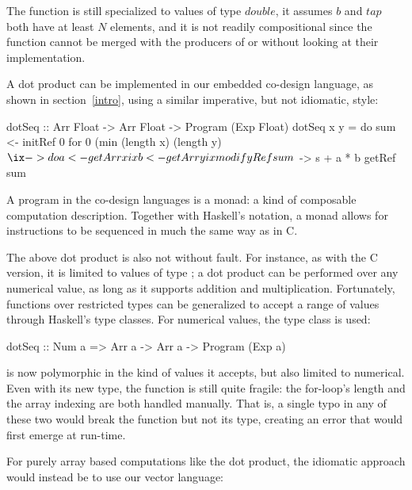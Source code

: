 \documentclass[../paper.tex]{subfiles}
\begin{document}
\noindent The function is still specialized to values of type $double$, it assumes $b$ and $tap$ both have at least $N$ elements, and it is not readily compositional since the function cannot be merged with the producers of  or  without looking at their implementation.

A dot product can be implemented in our embedded co-design language, as shown in section~\ref{intro}, using a similar imperative, but not idiomatic, style:

\begin{code}
dotSeq :: Arr Float -> Arr Float -> Program (Exp Float)
dotSeq x y = do
  sum <- initRef 0
  for 0 (min (length x) (length y) $ \ix -> do
    a <- getArr x ix
    b <- getArr y ix
    modifyRef sum $ \s -> s + a * b
  getRef sum
\end{code}

\noindent A program in the co-design languages is a monad: a kind of composable computation description. Together with Haskell's  notation, a monad allows for instructions to be sequenced in much the same way as in C.

The above dot product is also not without fault. For instance, as with the C version, it is limited to values of type ; a dot product can be performed over any numerical value, as long as it supports addition and multiplication. Fortunately, functions over restricted types can be generalized to accept a range of values through Haskell's type classes. For numerical values, the type class  is used:


\begin{code}
dotSeq :: Num a => Arr a -> Arr a -> Program (Exp a)
\end{code}

\noindent {} is now polymorphic in the kind of values it accepts, but also limited to numerical. Even with its new type, the function is still quite fragile: the for-loop's length and the array indexing are both handled manually. That is, a single typo in any of these two would break the function but not its type, creating an error that would first emerge at run-time.

For purely array based computations like the dot product, the idiomatic approach would instead be to use our vector language:

\end{document}
